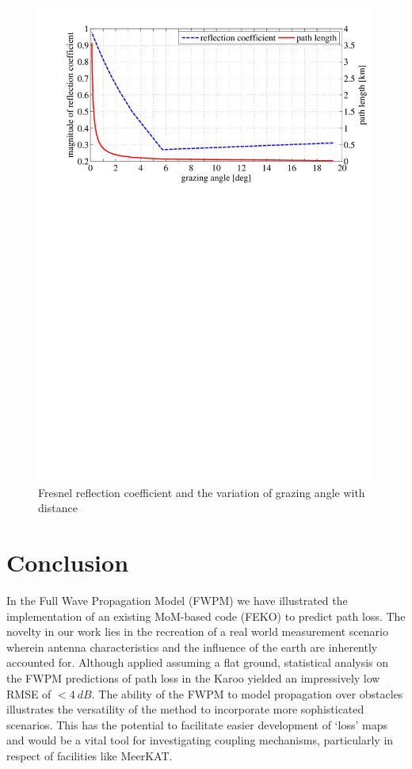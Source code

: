 \documentclass[10pt,journal,twoside]{IEEEtran}
\begin{document}
\begin{figure} %
	\includegraphics[width=\linewidth]{ground_reflection_coefficient_grazing_angle}
	\caption{Fresnel reflection coefficient and the variation of grazing angle with distance}
	\label{fig:reflect_grazing}
\end{figure} %
%
\section{Conclusion}\label{Conclusion}
In the Full Wave Propagation Model (FWPM) we have illustrated the implementation of an existing MoM-based code (FEKO) to predict path loss. The novelty in our work lies in the recreation of a real world measurement scenario wherein antenna characteristics and the influence of the earth are inherently accounted for. Although applied assuming a flat ground, statistical analysis on the FWPM predictions of path loss in the Karoo yielded an impressively low RMSE of $<\SI{4}{dB}$. The ability of the FWPM to model propagation over obstacles illustrates the versatility of the method to incorporate more sophisticated scenarios. This has the potential to facilitate easier development of `loss' maps and would be a vital tool for investigating coupling mechanisms, particularly in respect of facilities like MeerKAT. %
\end{document}

